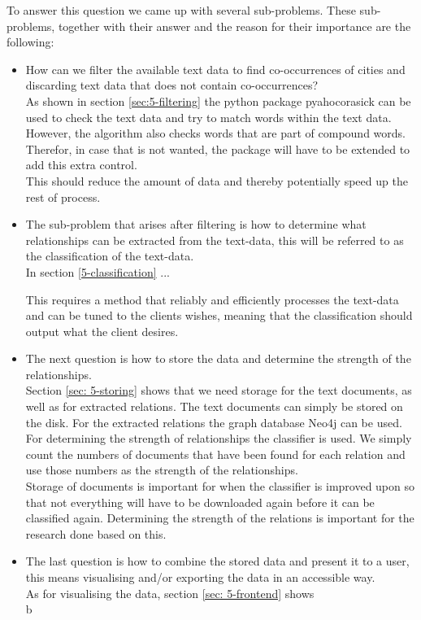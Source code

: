 To answer this question we came up with several sub-problems. These sub-problems, together with their answer and the reason for their importance are the following:
\begin{itemize}
    \item How can we filter the available text data to find co-occurrences of cities and discarding text data that does not contain co-occurrences? \\
    
    As shown in section \ref{sec:5-filtering} the python package pyahocorasick can be used to check the text data and try to match words within the text data. However, the algorithm also checks words that are part of compound words. Therefor, in case that is not wanted, the package will have to be extended to add this extra control. \\
    
    This should reduce the amount of data and thereby potentially speed up the rest of process.
    
    \item The sub-problem that arises after filtering is how to determine what relationships can be extracted from the text-data, this will be referred to as the classification of the text-data. \\
    
    In section \ref{5-classification} ... \todo{}
    
    This requires a method that reliably and efficiently processes the text-data and can be tuned to the clients wishes, meaning that the classification should output what the client desires. 
    
    \item The next question is how to store the data and determine the strength of the relationships. \\
    
    Section \ref{sec: 5-storing} shows that we need storage for the text documents, as well as for extracted relations. The text documents can simply be stored on the disk. For the extracted relations the graph database Neo4j can be used. \\
    For determining the strength of relationships the classifier is used. We simply count the numbers of documents that have been found for each relation and use those numbers as the strength of the relationships. \\
    
    Storage of documents is important for when the classifier is improved upon so that not everything will have to be downloaded again before it can be classified again. Determining the strength of the relations is important for the research done based on this.
    
    \item The last question is how to combine the stored data and present it to a user, this means visualising and/or exporting the data in an accessible way.\\
    
    As for visualising the data, section \ref{sec: 5-frontend} shows 
    \\
    \todo{}
    b
\end{itemize}

